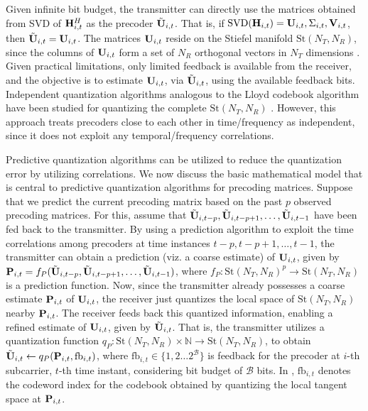 \documentclass[conference]{IEEEtran}
\begin{document}
{Given infinite bit budget, the transmitter can directly use the matrices obtained from SVD of ${\bf H}^{H}_{i,t}$ as the precoder $\tilde{{\bf U}}_{i,t}$.
That is, if $\text{SVD}({\bf H}_{i,t}) = {\bf U}_{i,t},\Sigma_{i,t}, {\bf V}_{i,t}$, then $\tilde{{\bf U}}_{i,t} = {\bf U}_{i,t}$.
The matrices ${\bf U}_{i,t}$ reside on the Stiefel manifold $\text{St}(N_T,N_R)$, since the columns of ${\bf U}_{i,t}$ form a set of $N_R$ orthogonal vectors in $N_T$ dimensions \cite{Gupt1905:Predictive,6891198}.
Given practical limitations, only limited feedback is available from the receiver, and the objective is to estimate ${\bf U}_{i,t}$, via $\tilde{{\bf U}}_{i,t}$, using the available feedback bits. Independent quantization algorithms analogous to the Lloyd codebook algorithm have been studied for quantizing the complete $\text{St}(N_T,N_R)$ \cite{6678348}.
However, this approach treats precoders close to each other in time/frequency as independent, since it does not exploit any temporal/frequency correlations.

Predictive quantization algorithms \cite{Gupt1905:Predictive,6891198} can be utilized to reduce the quantization error by utilizing correlations.
We now discuss the basic mathematical model that is central to predictive quantization algorithms for precoding matrices.
Suppose that we predict the current precoding matrix based on the past $p$ observed precoding matrices. For this, assume that $\tilde{{\bf U}}_{i,t-p},\tilde{{\bf U}}_{i,t-p+1},\ldots,\tilde{{\bf U}}_{i,t-1}$ have been fed back to the transmitter.
By using a prediction algorithm to exploit the time correlations among precoders at time instances $t-p,t-p+1,\ldots,t-1$, the transmitter can obtain a prediction (viz. a coarse estimate) of ${\bf U}_{i,t}$, given by ${\bf P}_{i,t}=f_P(\tilde{{\bf U}}_{i,t-p},\tilde{{\bf U}}_{i,t-p+1},\ldots,\tilde{{\bf U}}_{i,t-1})$, where $f_P: \text{St}(N_T,N_R)^{p} \to \text{St}(N_T,N_R)$ is a prediction function.
Now, since the transmitter already possesses a coarse estimate ${\bf P}_{i,t}$ of ${\bf U}_{i,t}$, the receiver just quantizes the local space of $\text{St}(N_T,N_R)$ nearby ${\bf P}_{i,t}$. The receiver feeds back this quantized information, enabling a refined estimate of ${\bf U}_{i,t}$, given by $\tilde{{\bf U}}_{i,t}$.
That is, the transmitter utilizes a quantization function $q_P:\text{St}(N_T,N_R) \times \mathbb{N} \to \text{St}(N_T,N_R)$, to obtain $\tilde{{\bf U}}_{i,t} \gets q_P({\bf P}_{i,t},\text{fb}_{i,t})$, where $\text{fb}_{i,t} \in \{1,2\ldots2^{\mathcal{B}}\}$ is feedback for the precoder at $i$-th subcarrier, $t$-th time instant, considering bit budget of $\mathcal{B}$ bits.
In \cite{Gupt1905:Predictive,6891198,6545375}, $\text{fb}_{i,t}$ denotes the codeword index for the codebook obtained by quantizing the local tangent space at ${\bf P}_{i,t}$.

}
\end{document}
